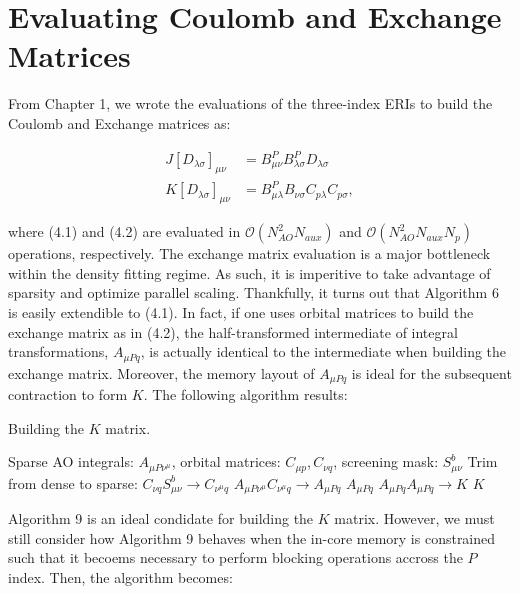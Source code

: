 \chapter{Evaluating Coulomb and Exchange Matrices}

From Chapter 1, we wrote the evaluations of the three-index ERIs to build the Coulomb and Exchange matrices as:

\begin{align}
J[D_{\lambda \sigma}]_{\mu \nu} &= B_{\mu \nu}^P B_{\lambda \sigma}^PD_{\lambda \sigma} \\
K[D_{\lambda \sigma}]_{\mu \nu} &= B_{\mu \lambda}^P B_{\nu \sigma}C_{p\lambda}C_{p\sigma},
\end{align}

\noindent where (4.1) and (4.2) are evaluated in $\mathcal{O}(N_{AO}^2N_{aux})$ and $\mathcal{O}(N_{AO}^2N_{aux}N_p)$ operations, respectively.
The exchange matrix evaluation is a major bottleneck within the density fitting regime. As such, it is imperitive to take advantage of sparsity
and optimize parallel scaling. Thankfully, it turns out that Algorithm 6 is easily 
extendible to (4.1). In fact, if one uses orbital matrices to build the exchange matrix as in (4.2), the half-transformed 
intermediate of integral transformations, $A_{\mu Pq}$, is actually identical to the intermediate when building the exchange matrix. 
Moreover, the memory layout of $A_{\mu Pq}$ is ideal for the subsequent contraction to form $K$. The following algorithm results:

\begin{algorithm}[H]
\caption{Building the $K$ matrix.}
\begin{algorithmic}
\REQUIRE Sparse AO integrals: $A_{\mu P \nu^\mu}$, orbital matrices: $C_{\mu p}, C_{\nu q}$, screening mask: $S_{\mu \nu}^b$
    \STATE Trim from dense to sparse: $C_{\nu q}S_{\mu \nu}^b \rightarrow C_{\nu^{\mu} q}$
    \STATE $A_{\mu P \nu^{\mu}} C_{\nu^{\mu} q} \rightarrow A_{\mu Pq}$
\ENDFOR
\RETURN $A_{\mu P q}$
\STATE $A_{\mu P q} A_{\mu P q} \rightarrow K $
\RETURN $K$
\end{algorithmic}
\end{algorithm}

Algorithm 9 is an ideal condidate for building the $K$ matrix. However, we must still consider how Algorithm 9 behaves when the 
in-core memory is constrained such that it becoems necessary to perform blocking operations accross the $P$ index. Then, the algorithm
becomes: 

